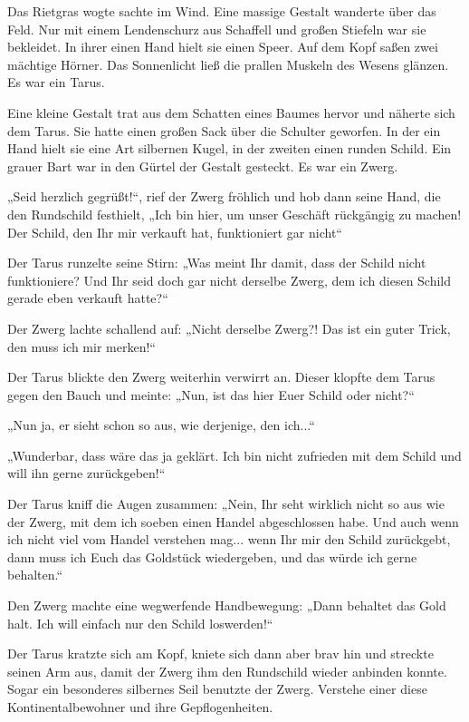 

Das Rietgras wogte sachte im Wind. Eine massige Gestalt wanderte über das Feld. Nur mit einem Lendenschurz aus Schaffell und großen Stiefeln war sie bekleidet. In ihrer einen Hand hielt sie einen Speer. Auf dem Kopf saßen zwei mächtige Hörner. Das Sonnenlicht ließ die prallen Muskeln des Wesens glänzen. Es war ein Tarus.

Eine kleine Gestalt trat aus dem Schatten eines Baumes hervor und näherte sich dem Tarus. Sie hatte einen großen Sack über die Schulter geworfen. In der ein Hand hielt sie eine Art silbernen Kugel, in der zweiten einen runden Schild. Ein grauer Bart war in den Gürtel der Gestalt gesteckt. Es war ein Zwerg.

„Seid herzlich gegrüßt!“, rief der Zwerg fröhlich und hob dann seine Hand, die den Rundschild festhielt, „Ich bin hier, um unser Geschäft rückgängig zu machen! Der Schild, den Ihr mir verkauft hat, funktioniert gar nicht“

Der Tarus runzelte seine Stirn: „Was meint Ihr damit, dass der Schild nicht funktioniere? Und Ihr seid doch gar nicht derselbe Zwerg, dem ich diesen Schild gerade eben verkauft hatte?“

Der Zwerg lachte schallend auf: „Nicht derselbe Zwerg?! Das ist ein guter Trick, den muss ich mir merken!“

Der Tarus blickte den Zwerg weiterhin verwirrt an. Dieser klopfte dem Tarus gegen den Bauch und meinte: „Nun, ist das hier Euer Schild oder nicht?“

„Nun ja, er sieht schon so aus, wie derjenige, den ich...“

„Wunderbar, dass wäre das ja geklärt. Ich bin nicht zufrieden mit dem Schild und will ihn gerne zurückgeben!“

Der Tarus kniff die Augen zusammen: „Nein, Ihr seht wirklich nicht so aus wie der Zwerg, mit dem ich soeben einen Handel abgeschlossen habe. Und auch wenn ich nicht viel vom Handel verstehen mag... wenn Ihr mir den Schild zurückgebt, dann muss ich Euch das Goldstück wiedergeben, und das würde ich gerne behalten.“

Den Zwerg machte eine wegwerfende Handbewegung: „Dann behaltet das Gold halt. Ich will einfach nur den Schild loswerden!“

Der Tarus kratzte sich am Kopf, kniete sich dann aber brav hin und streckte seinen Arm aus, damit der Zwerg ihm den Rundschild wieder anbinden konnte. Sogar ein besonderes silbernes Seil benutzte der Zwerg. Verstehe einer diese Kontinentalbewohner und ihre Gepflogenheiten.

